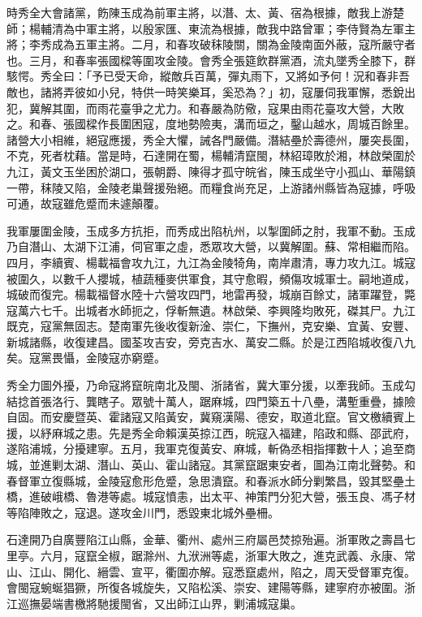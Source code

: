 \begin{pinyinscope}
時秀全大會諸黨，飭陳玉成為前軍主將，以潛、太、黃、宿為根據，敵我上游楚師；楊輔清為中軍主將，以殷家匯、東流為根據，敵我中路曾軍；李侍賢為左軍主將；李秀成為五軍主將。二月，和春攻破秣陵關，關為金陵南面外蔽，寇所嚴守者也。三月，和春率張國樑等圍攻金陵。會秀全張筵飲群黨酒，流丸墜秀全膝下，群駭愕。秀全曰：「予已受天命，縱敵兵百萬，彈丸雨下，又將如予何！況和春非吾敵也，諸將弄彼如小兒，特供一時笑樂耳，奚恐為？」初，寇屢伺我軍懈，悉銳出犯，冀解其圍，而雨花臺爭之尤力。和春嚴為防儆，寇果由雨花臺攻大營，大敗之。和春、張國樑作長圍困寇，度地勢險夷，溝而垣之，鑿山越水，周城百餘里。諸營大小相維，絕寇應援，秀全大懼，誡各門嚴備。潛結壘於壽德州，屢突長圍，不克，死者枕藉。當是時，石達開在蜀，楊輔清竄閩，林紹璋敗於湘，林啟榮圍於九江，黃文玉坐困於湖口，張朝爵、陳得才孤守皖省，陳玉成坐守小孤山、華陽鎮一帶，秣陵又陷，金陵老巢聲援殆絕。而糧食尚充足，上游諸州縣皆為寇據，呼吸可通，故寇雖危蹙而未遽顛覆。

我軍屢圍金陵，玉成多方抗拒，而秀成出陷杭州，以掣圍師之肘，我軍不動。玉成乃自潛山、太湖下江浦，伺官軍之虛，悉眾攻大營，以冀解圍。蘇、常相繼而陷。四月，李續賓、楊載福會攻九江，九江為金陵犄角，南岸肅清，專力攻九江。城寇被圍久，以數千人攖城，植蔬種麥供軍食，其守愈暇，頻傷攻城軍士。嗣地道成，城破而復完。楊載福督水陸十六營攻四門，地雷再發，城崩百餘丈，諸軍躍登，斃寇萬六七千。出城者水師扼之，俘斬無遺。林啟榮、李興隆均敗死，磔其尸。九江既克，寇黨無固志。楚南軍先後收復新淦、崇仁，下撫州，克安樂、宜黃、安豐、新城諸縣，收復建昌。國荃攻吉安，旁克吉水、萬安二縣。於是江西陷城收復八九矣。寇黨畏懾，金陵寇亦窮蹙。

秀全力圖外擾，乃命寇將竄皖南北及閩、浙諸省，冀大軍分援，以牽我師。玉成勾結捻首張洛行、龔瞎子。眾號十萬人，踞麻城，四門築五十八壘，溝塹重疊，據險自固。而安慶暨英、霍諸寇又陷黃安，冀窺漢陽、德安，取道北竄。官文檄續賓上援，以紓麻城之患。先是秀全命賴漢英掠江西，皖寇入福建，陷政和縣、邵武府，遂陷浦城，分擾建寧。五月，我軍克復黃安、麻城，斬偽丞相指揮數十人；追至商城，並進剿太湖、潛山、英山、霍山諸寇。其黨竄踞東安者，圖為江南北聲勢。和春督軍立復縣城，金陵寇愈形危蹙，急思潰竄。和春派水師分剿繁昌，毀其堅壘土橋，進破峨橋、魯港等處。城寇憤恚，出太平、神策門分犯大營，張玉良、馮子材等陷陣敗之，寇退。遂攻金川門，悉毀東北城外壘柵。

石達開乃自廣豐陷江山縣，金華、衢州、處州三府屬邑焚掠殆遍。浙軍敗之壽昌七里亭。六月，寇竄全椒，踞滁州、九洑洲等處，浙軍大敗之，進克武義、永康、常山、江山、開化、縉雲、宣平，衢圍亦解。寇悉竄處州，陷之，周天受督軍克復。會閩寇蜿蜒猖獗，所復各城旋失，又陷松溪、崇安、建陽等縣，建寧府亦被圍。浙江巡撫晏端書檄將馳援閩省，又出師江山界，剿浦城寇巢。


\end{pinyinscope}
